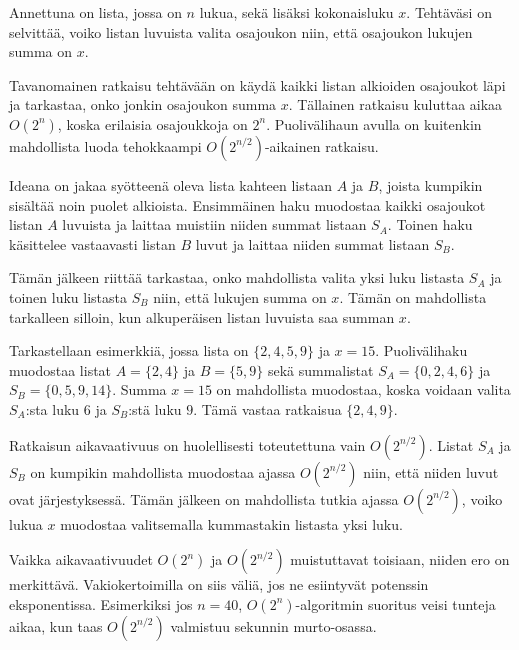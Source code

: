 \begin{task}
Annettuna on lista, jossa on $n$ lukua,
sekä lisäksi kokonaisluku $x$.
Tehtäväsi on selvittää, voiko listan luvuista
valita osajoukon niin, että osajoukon lukujen summa on $x$.
\end{task}

Tavanomainen ratkaisu tehtävään on käydä kaikki
listan alkioiden osajoukot läpi ja tarkastaa,
onko jonkin osajoukon summa $x$.
Tällainen ratkaisu kuluttaa aikaa $O(2^n)$,
koska erilaisia osajoukkoja on $2^n$.
Puolivälihaun avulla on kuitenkin mahdollista luoda
tehokkaampi $O(2^{n/2})$-aikainen ratkaisu.

Ideana on jakaa syötteenä oleva lista
kahteen listaan $A$ ja $B$,
joista kumpikin sisältää noin puolet alkioista.
Ensimmäinen haku muodostaa kaikki osajoukot
listan $A$ luvuista ja laittaa muistiin niiden summat
listaan $S_A$.
Toinen haku käsittelee vastaavasti listan $B$ luvut
ja laittaa niiden summat listaan $S_B$.

Tämän jälkeen riittää tarkastaa,
onko mahdollista valita yksi luku listasta $S_A$
ja toinen luku listasta $S_B$ niin,
että lukujen summa on $x$.
Tämän on mahdollista tarkalleen silloin,
kun alkuperäisen listan luvuista saa summan $x$.

Tarkastellaan esimerkkiä,
jossa lista on $\{2,4,5,9\}$
ja $x=15$.
Puolivälihaku muodostaa listat $A=\{2,4\}$
ja $B=\{5,9\}$ sekä summalistat
$S_A=\{0,2,4,6\}$ ja $S_B=\{0,5,9,14\}$.
Summa $x=15$ on mahdollista muodostaa,
koska voidaan valita $S_A$:sta luku $6$
ja $S_B$:stä luku $9$.
Tämä vastaa ratkaisua $\{2,4,9\}$.

Ratkaisun aikavaativuus on huolellisesti toteutettuna
vain $O(2^{n/2})$.
Listat $S_A$ ja $S_B$ on kumpikin mahdollista
muodostaa ajassa $O(2^{n/2})$ niin,
että niiden luvut ovat järjestyksessä.
Tämän jälkeen on mahdollista tutkia ajassa
$O(2^{n/2})$, voiko lukua $x$ muodostaa
valitsemalla kummastakin listasta yksi luku.

Vaikka aikavaativuudet $O(2^n)$ ja $O(2^{n/2})$
muistuttavat toisiaan, niiden ero on merkittävä.
Vakiokertoimilla on siis väliä, jos ne esiintyvät
potenssin eksponentissa.
Esimerkiksi jos $n=40$, $O(2^n)$-algoritmin suoritus
veisi tunteja aikaa, kun taas $O(2^{n/2})$
valmistuu sekunnin murto-osassa.
